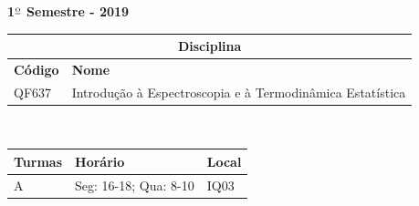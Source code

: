 \documentclass[11pt,a4paper,ssfamily]{exam}                                        %
\begin{document}
\begin{center}                                                                     %
\textbf{                                                                           %
1$^\textrm{\underline{o}}$ Semestre - 2019
}\\                                                                                %
\vspace{0.5cm}                                                                     %
\begin{tabularx}{\textwidth}{|l|X|}                                                %
\hline                                                                             %
\multicolumn{2}{|c|}{\cellcolor{lightgray} \textbf{\Large{Disciplina}}} \\         %
\hline                                                                             %
\cellcolor{lightgray}\textbf{Código}    & \cellcolor{lightgray}\textbf{Nome} \\    %
\hline                                                                             %
QF637     &  Introdução à Espectroscopia e à Termodinâmica Estatística \\
\hline                                                                             %
\end{tabularx}\\                                                                   %
\vspace{0.5cm}                                                                     %
\begin{tabularx}{\textwidth}{|l|l|X|}                                              %
\hline                                                                             %
\cellcolor{lightgray}\textbf{Turmas} &\cellcolor{lightgray}                        %
\textbf{Horário} &\cellcolor{lightgray}\textbf{Local} \\                           %
\hline                                                                             %
A    &  Seg: 16-18; Qua: 8-10 & IQ03 \\\hline

\end{tabularx}
\end{center}
\end{document}
